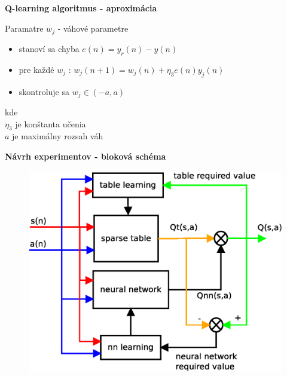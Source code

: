 \documentclass[xcolor=dvipsnames]{beamer}
\begin{document}
\begin{frame}{\bf Q-learning algoritmus - aproximácia}

Paramatre $w_{j}$ - váhové parametre

\begin{itemize}
\item stanoví sa chyba $e(n) = y_r(n) - y(n)$
\item pre každé $w_{j}$ : $w_j(n+1)= w_j(n) + \eta_3 e(n)y_j(n)$
\item skontroluje sa $w_j \in (-a, a)$
\end{itemize}

kde \\
$\eta_3$ je konštanta učenia \\
$a$ je maximálny rozsah váh \\
\end{frame}


\begin{frame}{\bf Návrh experimentov - bloková schéma}

\begin{figure}[!htb]
\centering
\includegraphics[scale=.4]{../diagrams/q_learning_hybrid.eps}
\end{figure}

\end{frame}
\end{document}
